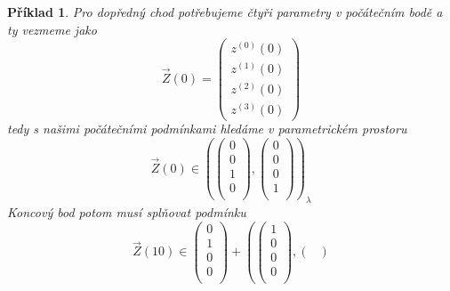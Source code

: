 \documentclass{article}
\newtheorem{example}{Příklad}
\begin{document}
\begin{example}
    Pro dopředný chod potřebujeme čtyři parametry v počátečním bodě a ty vezmeme jako
    \begin{equation}
        \vec{Z}(0) = 
        \begin{pmatrix}
            z^{(0)}(0)\\
            z^{(1)}(0) \\
            z^{(2)}(0) \\
            z^{(3)}(0)
        \end{pmatrix} 
    \end{equation}
    tedy s našimi počátečními podmínkami hledáme v parametrickém prostoru
    \begin{equation}
        \vec{Z}(0) \in \left( 
            \begin{pmatrix}
                0 \\
                0 \\
                1 \\
                0 \\
            \end{pmatrix} ,
            \begin{pmatrix}
                0 \\
                0 \\
                0 \\
                1 \\
            \end{pmatrix} 
            \right)_{\lambda}
        \end{equation}
        Koncový bod potom musí splňovat podmínku 
        \begin{equation}
            \vec{Z}(10) \in 
            \begin{pmatrix}
                0 \\
                1 \\
                0 \\
                0 \\
            \end{pmatrix}  + 
            \left( 
                \begin{pmatrix} 
                    1 \\
                    0 \\
                    0 \\
                    0 \\
                \end{pmatrix},
                \begin{pmatrix} 

\end{pmatrix}
\end{equation}
\end{example}
\end{document}
